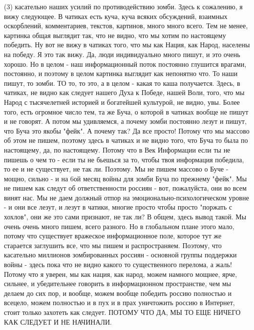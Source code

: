 (3) касательно наших усилий по противодействию зомби.  Здесь к сожалению, я
вижу следующее. В чатиках есть куча, куча всяких обсуждений, взаимных
оскорблений, комментариев, текстов, картинов, много много всего. Тем не менее,
картинка общая выглядит так, что не видно, что мы хотим по настоящему победить.
Ну вот не вижу в чатиках того, что мы как Нация, как Народ, населены на победу.
Я это так вижу. Да, люди индивидуально много пишут, и это очень хорошо. Но в
целом - наш информационный поток постоянно глушится врагами, постоянно, и
поэтому в целом картинка выглядит как непонятно что. То наши пишут, то зомби.
ТО то, то это, а в целом - какая то каша получается.  Здесь, в чатиках, не
видно как следует нашего Духа к Победе, нашей Воли, того, что мы Народ с
тысячелетней историей и богатейшей культурой, не видно, увы.  Более того, есть
огромное число тем, та же Буча, о которой в чатиках вообще не пишут и не
говорят. А потом мы удивляемся, а почему зомби постоянно лезут и пишут, что
Буча это якобы "фейк". А почему так?  Да все просто! Потому что мы массово об
этом не пишем, поэтому здесь в чатиках и не видно того, что Буча то была по
настоящему, да, по настоящему. Потому что в Век Информации если ты не пишешь о
чем то - если ты не бьешься за то, чтобы твоя информация победила, то ее и не
существует, не так ли. Поэтому. Мы не пишем массово о Буче - мощно, сильно - и
на 6ой месяц войны для зомби Буча по прежнему "фейк". Мы не пишем как следут об
ответственности россиян -  вот, пожалуйста, они во всем винят нас. Мы не даем
должный отпор на эмоционально-психологическом уровне - и они все лезут, и лезут
в чатики, многие просто чтобы просто "поржать с хохлов", они же это сами
признают, не так ли? В общем, здесь вывод такой. Мы очень очень много пишем,
всего разного. Но в глобальном плане этого мало, потому что существует
вражеское информационное поле, которое тут же старается заглушить все, что мы
пишем и распространяем. Поэтому, что касательно миллионов зомбированных россиян
- основной группы поддержки войны - здесь пока что не видно какого то
существенного перелома, а жаль! Потому что я уверен, мы как нация, как народ,
можем намного мощнее, ярче, сильнее, и убедительнее говорить в информационном
пространстве, чем мы делаем до сих пор, и вообще, можем вообще победить россию
полностью и всецело, можем полностью и в пух и в прах уничтожить россию в
Интернет, стоит только захотеть как следует. ПОТОМУ ЧТО ДА, МЫ ТО ЕЩЕ НИЧЕГО
КАК СЛЕДУЕТ И НЕ НАЧИНАЛИ.


